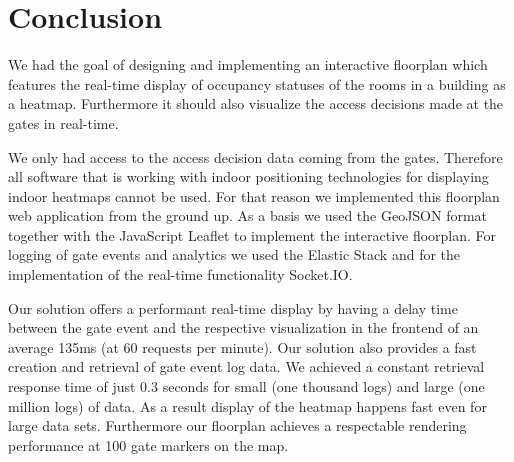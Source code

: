 \section{Conclusion}
We had the goal of designing and implementing an interactive floorplan which features the real-time display of occupancy statuses of the rooms in a building as a heatmap. Furthermore it should also visualize the access decisions made at the gates in real-time. 

We only had access to the access decision data coming from the gates. Therefore all software that is working with indoor positioning technologies for displaying indoor heatmaps cannot be used. For that reason we implemented this floorplan web application from the ground up. As a basis we used the GeoJSON format together with the JavaScript Leaflet to implement the interactive floorplan. For logging of gate events and analytics we used the Elastic Stack and for the implementation of the real-time functionality Socket.IO. 

Our solution offers a performant real-time display by having a delay time between the gate event and the respective visualization in the frontend of an average 135ms (at 60 requests per minute).
Our solution also provides a fast creation and retrieval of gate event log data. We achieved a constant retrieval response time of just 0.3 seconds for small (one thousand logs) and large (one million logs) of data. As a result display of the heatmap happens fast even for large data sets. Furthermore our floorplan achieves a respectable rendering performance at 100 gate markers on the map.

\clearpage

